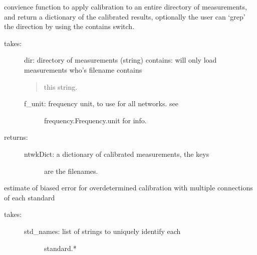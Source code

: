 \documentclass[letterpaper,10pt,english]{sphinxmanual}
\begin{document}
\begin{fulllineitems}
\begin{fulllineitems}
\label{api/mwavepy.calibration:mwavepy.calibration.calibration.Calibration.apply_cal_to_all_in_dir}
convience function to apply calibration to an entire directory
of measurements, and return a dictionary of the calibrated
results, optionally the user can `grep' the direction
by using the contains switch.
\begin{description}
\item[{takes:}] \leavevmode
dir: directory of measurements (string)
contains: will only load measurements who's filename contains
\begin{quote}

this string.
\end{quote}
\begin{description}
\item[{f\_unit: frequency unit, to use for all networks. see}] \leavevmode
frequency.Frequency.unit for info.

\end{description}

\item[{returns:}] \leavevmode\begin{description}
\item[{ntwkDict: a dictionary of calibrated measurements, the keys}] \leavevmode
are the filenames.

\end{description}

\end{description}

\end{fulllineitems}


\begin{fulllineitems}
\label{api/mwavepy.calibration:mwavepy.calibration.calibration.Calibration.biased_error}
estimate of biased error for overdetermined calibration with
multiple connections of each standard
\begin{description}
\item[{takes:}] \leavevmode\begin{description}
\item[{std\_names: list of strings to uniquely identify each}] \leavevmode
standard.*


\end{description}
\end{description}
\end{fulllineitems}
\end{fulllineitems}
\end{document}
